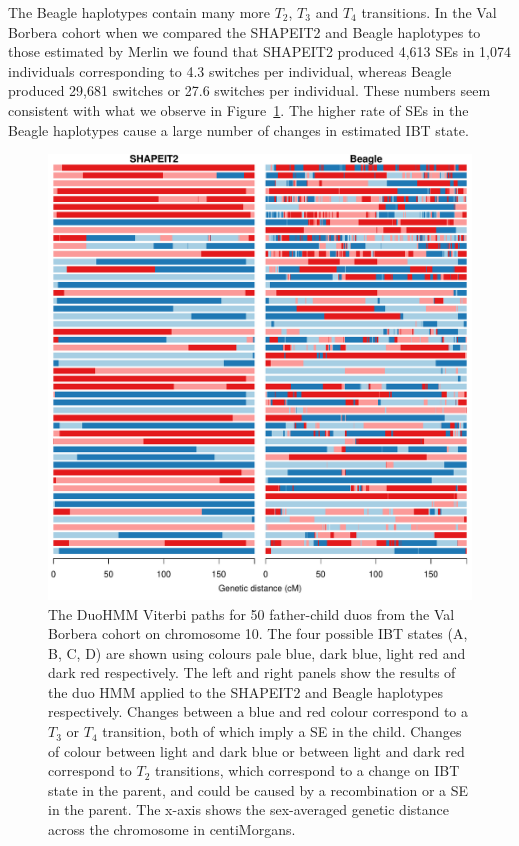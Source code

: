 The Beagle haplotypes contain many more $T_2$, $T_3$ and $T_4$ transitions. In the Val Borbera cohort when we compared the SHAPEIT2 and Beagle haplotypes to those estimated by Merlin we found that SHAPEIT2 produced 4,613 SEs in 1,074 individuals corresponding to 4.3 switches per individual, whereas Beagle produced 29,681 switches or 27.6 switches per individual. These numbers seem consistent with what we observe in Figure~\ref{fig:duo_hmm}. The higher rate of SEs in the Beagle haplotypes cause a large number of changes in estimated IBT state.

\begin{figure}[p]
 \begin{center} 
  \includegraphics[width=\textwidth]{chap4figs/valborbera_b37-paternal}
   \caption[Observed DuoHMM paths in real data]{The DuoHMM Viterbi paths for 50 father-child duos from the Val Borbera cohort on chromosome 10. The four possible IBT states (A, B, C, D) are shown using colours pale blue, dark blue, light red and dark red respectively. The left and right panels show the results of the duo HMM applied to the SHAPEIT2 and Beagle haplotypes respectively. Changes between a blue and red colour correspond to a $T_3$ or $T_4$ transition, both of which imply a SE in the child. Changes of colour between light and dark blue or between light and dark red correspond to $T_2$ transitions, which correspond to a change on IBT state in the parent, and could be caused by a recombination or a SE in the parent. The x-axis shows the sex-averaged genetic distance across the chromosome in centiMorgans. \label{fig:duo_hmm}}
 \end{center} 
\end{figure}

